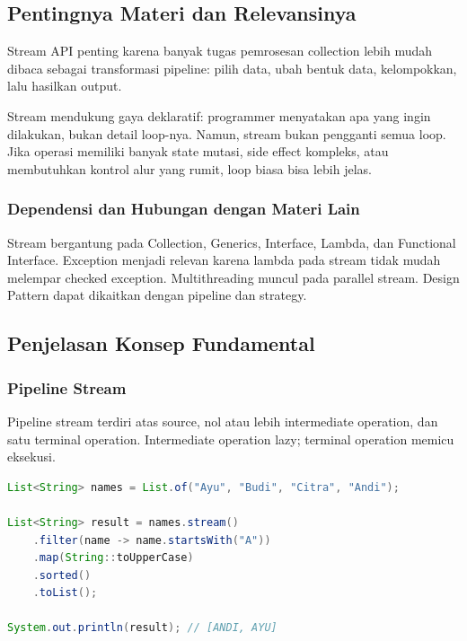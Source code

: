 \subsection{Pentingnya Materi dan Relevansinya}

\begin{jawab}
Stream API penting karena banyak tugas pemrosesan collection lebih mudah dibaca sebagai transformasi pipeline: pilih data, ubah bentuk data, kelompokkan, lalu hasilkan output.
\end{jawab}

Stream mendukung gaya deklaratif: programmer menyatakan apa yang ingin dilakukan, bukan detail loop-nya. Namun, stream bukan pengganti semua loop. Jika operasi memiliki banyak state mutasi, side effect kompleks, atau membutuhkan kontrol alur yang rumit, loop biasa bisa lebih jelas.

\subsubsection{Dependensi dan Hubungan dengan Materi Lain}

Stream bergantung pada Collection, Generics, Interface, Lambda, dan Functional Interface. Exception menjadi relevan karena lambda pada stream tidak mudah melempar checked exception. Multithreading muncul pada parallel stream. Design Pattern dapat dikaitkan dengan pipeline dan strategy.

\subsection{Penjelasan Konsep Fundamental}

\subsubsection{Pipeline Stream}

\begin{jawab}
Pipeline stream terdiri atas source, nol atau lebih intermediate operation, dan satu terminal operation. Intermediate operation lazy; terminal operation memicu eksekusi.
\end{jawab}

\begin{lstlisting}[language=Java, caption={Pipeline Stream dasar}, label={lst:stream-pipeline}]
List<String> names = List.of("Ayu", "Budi", "Citra", "Andi");

List<String> result = names.stream()
    .filter(name -> name.startsWith("A"))
    .map(String::toUpperCase)
    .sorted()
    .toList();

System.out.println(result); // [ANDI, AYU]
\end{lstlisting}

